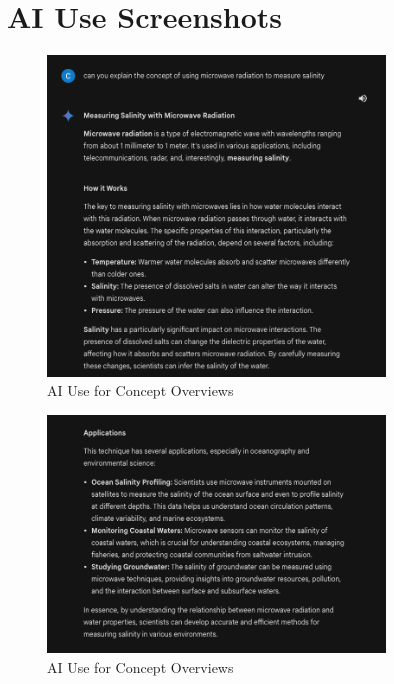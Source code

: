 \chapter{AI Use Screenshots}\label{appx:aiuse}

\begin{figure}[!ht]
    \centering
    \includegraphics[width=0.8\textwidth]{Figures/AI_Use/concept_overviews}
    \caption{AI Use for Concept Overviews}
\end{figure}
\begin{figure}[!ht]
    \centering
    \includegraphics[width=0.8\textwidth]{Figures/AI_Use/concept_overviews2}
    \caption{AI Use for Concept Overviews}
\end{figure}
